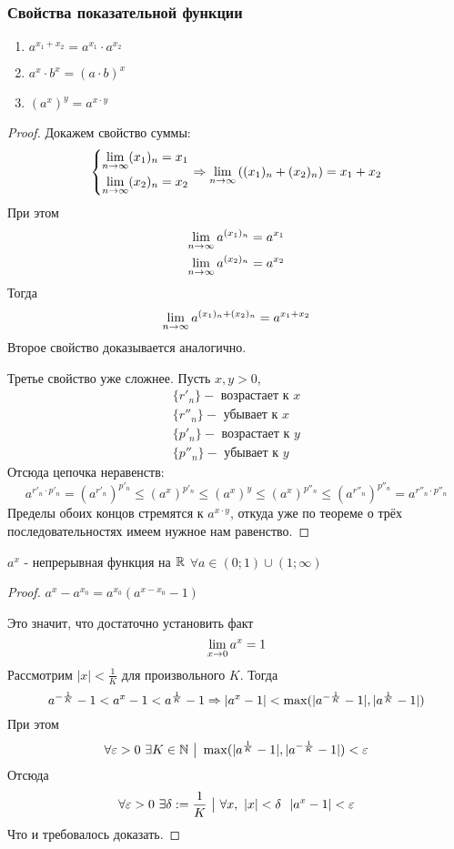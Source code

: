 \subsubsection{Свойства показательной функции}

\begin{enumerate}
	\item $a^{x_1 + x_2} = a^{x_1} \cdot a^{x_2}$
	\item $a^x \cdot b^x = (a \cdot b)^x$
	\item $(a^x)^y = a^{x \cdot y}$
\end{enumerate}

\begin{proof}
	Докажем свойство суммы:
	\[
		\left\{\begin{aligned}
		\lim\limits_{n \to \infty} (x_1)_n = x_1
		\\
		\lim\limits_{n \to \infty} (x_2)_n = x_2
		\end{aligned}\right.
		\Rightarrow
		\lim\limits_{n \to \infty} \left((x_1)_n + (x_2)_n\right) = x_1 + x_2
	\]
	При этом
	\begin{align*}
		\lim\limits_{n \to \infty} a^{(x_1)_n} = a^{x_1}
		\\
		\lim\limits_{n \to \infty} a^{(x_2)_n} = a^{x_2}
	\end{align*}
	Тогда
	$$
		\lim\limits_{n \to \infty} a^{(x_1)_n + (x_2)_n} = a^{x_1 + x_2}
	$$
	Второе свойство доказывается аналогично.
	
	Третье свойство уже сложнее. Пусть $x, y > 0$,
	\begin{align*}
		\{r'_n\} - \text{ возрастает к } x
		\\
		\{r''_n\} - \text{ убывает к } x
		\\
		\{p'_n\} - \text{ возрастает к } y
		\\
		\{p''_n\} - \text{ убывает к } y
	\end{align*}
	Отсюда цепочка неравенств:
	\[
		a^{r'_n \cdot p'_n} = (a^{r'_n})^{p'_n} \le (a^x)^{p'_n} \le (a^x)^y \le (a^x)^{p''_n} \le (a^{r''_n})^{p''_n} = a^{r''_n \cdot p''_n}
	\]
	Пределы обоих концов стремятся к $a^{x \cdot y}$, откуда уже по теореме о трёх последовательностях имеем нужное нам равенство.
\end{proof}

\begin{theorem}
	$a^x$ - непрерывная функция на $\mathbb{R}$ $\forall a \in (0; 1) \cup (1; \infty)$
\end{theorem}

\begin{proof}
	$a^x - a^{x_0} = a^{x_0}(a^{x - x_0} - 1)$
	
	Это значит, что достаточно установить факт
	\[
		\lim\limits_{x \to 0} a^x = 1
	\]
	Рассмотрим $|x| < \frac{1}{K}$ для произвольного $K$. Тогда
	\[
		a^{-\frac{1}{K}} - 1 < a^x - 1 < a^{\frac{1}{K}} - 1 \Rightarrow |a^x - 1| < \max(|a^{-\frac{1}{K}} - 1|, |a^{\frac{1}{K}} - 1|)
	\]
	При этом
	\[
		\forall \varepsilon > 0\ \exists K \in \mathbb{N} \ \big|\  \max(|a^{\frac{1}{K}} - 1|, |a^{-\frac{1}{K}} - 1|) < \varepsilon
	\]
	Отсюда
	\[
		\forall \varepsilon > 0\ \exists \delta := \frac{1}{K} \ \big|\  \forall x,\ |x| < \delta\ \ |a^x - 1| < \varepsilon
	\]
	Что и требовалось доказать.
\end{proof}

